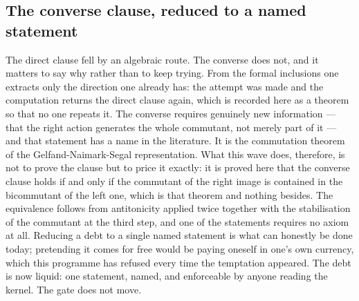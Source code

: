 \documentclass[11pt]{article}
\theoremstyle{definition}\newtheorem{deriv}{Derivation}
\begin{document}
\subsection*{The converse clause, reduced to a named statement}The direct clause fell by an algebraic route. The converse does not, and it matters to say why rather than to keep trying. From the formal inclusions one extracts only the direction one already has: the attempt was made and the computation returns the direct clause again, which is recorded here as a theorem so that no one repeats it. The converse requires genuinely new information --- that the right action generates the whole commutant, not merely part of it --- and that statement has a name in the literature. It is the commutation theorem of the Gelfand-Naimark-Segal representation. What this wave does, therefore, is not to prove the clause but to price it exactly: it is proved here that the converse clause holds if and only if the commutant of the right image is contained in the bicommutant of the left one, which is that theorem and nothing besides. The equivalence follows from antitonicity applied twice together with the stabilisation of the commutant at the third step, and one of the statements requires no axiom at all. Reducing a debt to a single named statement is what can honestly be done today; pretending it comes for free would be paying oneself in one's own currency, which this programme has refused every time the temptation appeared. The debt is now liquid: one statement, named, and enforceable by anyone reading the kernel. The gate does not move.
\end{document}
